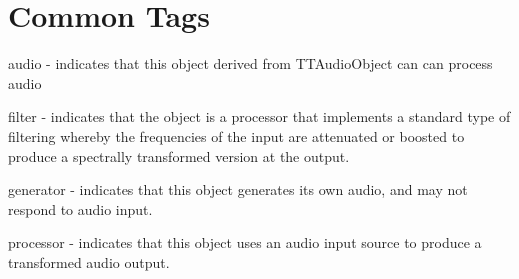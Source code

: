 \appendix

\chapter{Common Tags}

audio - indicates that this object derived from TTAudioObject can can process audio

filter - indicates that the object is a processor that implements a standard type of filtering whereby the frequencies of the input are attenuated or boosted to produce a spectrally transformed version at the output.

generator - indicates that this object generates its own audio, and may not respond to audio input.

processor - indicates that this object uses an audio input source to produce a transformed audio output.

